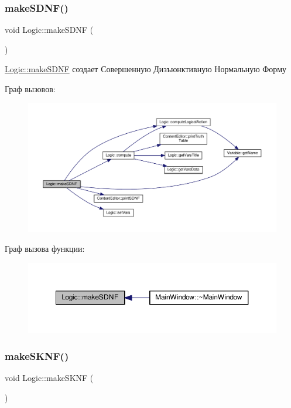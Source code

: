 \subsubsection{\texorpdfstring{make\+S\+D\+N\+F()}{makeSDNF()}}
{\footnotesize\ttfamily void Logic\+::make\+S\+D\+NF (\begin{DoxyParamCaption}{ }\end{DoxyParamCaption})}



\hyperlink{class_logic_a1494325c8d91b7fe5728b7dbdf82fca3}{Logic\+::make\+S\+D\+NF} создает Совершенную Дизъюнктивную Нормальную Форму 

Граф вызовов\+:\nopagebreak
\begin{figure}[H]
\begin{center}
\leavevmode
\includegraphics[width=350pt]{class_logic_a1494325c8d91b7fe5728b7dbdf82fca3_cgraph}
\end{center}
\end{figure}
Граф вызова функции\+:\nopagebreak
\begin{figure}[H]
\begin{center}
\leavevmode
\includegraphics[width=350pt]{class_logic_a1494325c8d91b7fe5728b7dbdf82fca3_icgraph}
\end{center}
\end{figure}
\mbox{\label{class_logic_a008dd758dde00f1f5940558f275ec216}} 
\subsubsection{\texorpdfstring{make\+S\+K\+N\+F()}{makeSKNF()}}
{\footnotesize\ttfamily void Logic\+::make\+S\+K\+NF (\begin{DoxyParamCaption}{ }\end{DoxyParamCaption})}




